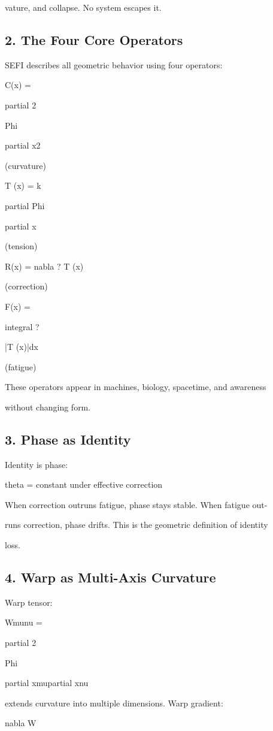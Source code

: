 \documentclass[10pt]{article}
\begin{document}
vature, and collapse. No system escapes it.


\subsection*{2. The Four Core Operators}
SEFI describes all geometric behavior using four operators:

C(x) =

partial 2

Phi

partial x2

(curvature)

T (x) = k

partial Phi

partial x

(tension)

R(x) = nabla  ? T (x)

(correction)

F(x) =

integral ?

|T (x)|dx

(fatigue)

These operators appear in machines, biology, spacetime, and awareness

without changing form.

\subsection*{3. Phase as Identity}
Identity is phase:

theta = constant under effective correction

When correction outruns fatigue, phase stays stable. When fatigue out-

runs correction, phase drifts. This is the geometric definition of identity

loss.

\subsection*{4. Warp as Multi-Axis Curvature}
Warp tensor:

Wmunu =

partial 2

Phi

partial xmupartial xnu

extends curvature into multiple dimensions. Warp gradient:


nabla W
\end{document}
